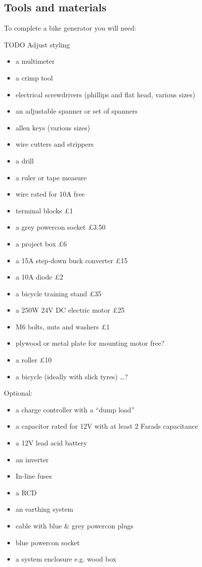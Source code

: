 \documentclass{article}
\theoremstyle{definition}
\theoremstyle{definition}
\theoremstyle{remark}
\begin{document}

  {\color{blue}\subsection{Tools and materials}} %
  \label{sub:tools_and_materials}

    To complete a bike generator you will need: 

    TODO Adjust styling

    \begin{itemize}
      \item a multimeter
      \item a crimp tool
      \item electrical screwdrivers (phillips and flat head, various sizes)
      \item an adjustable spanner or set of spanners
      \item allen keys (various sizes)
      \item wire cutters and strippers
      \item a drill
      \item a ruler or tape measure
      \item wire rated for 10A free
      \item terminal blocks £1
      \item a grey powercon socket £3.50
      \item a project box £6
      \item a 15A step-down buck converter £15
      \item a 10A diode £2
      \item a bicycle training stand £35
      \item a 250W 24V DC electric motor £25
      \item M6 bolts, nuts and washers £1
      \item plywood or metal plate for mounting motor free?
      \item a roller £10
      \item a bicycle (ideally with slick tyres) …?
    \end{itemize}

    Optional:

    \begin{itemize}
      \item a charge controller with a “dump load”
      \item a capacitor rated for 12V with at least 2 Farads capacitance
      \item a 12V lead acid battery
      \item an inverter
      \item In-line fuses
      \item a RCD
      \item an earthing system
      \item cable with blue \& grey powercon plugs
      \item blue powercon socket
      \item a system enclosure e.g. wood box
    \end{itemize}
\end{document}
